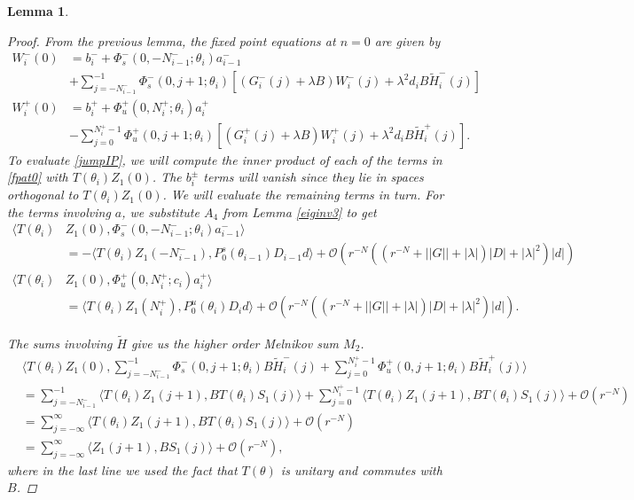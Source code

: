 \documentclass[12pt]{article}
\newtheorem{lemma}{Lemma}
\begin{document}
\begin{lemma}
\begin{proof}
From the previous lemma, the fixed point equations at $n = 0$ are given by 
\begin{equation}\label{fpat0}
\begin{aligned}
W_i^-(0) &= b_i^- +
\Phi_s^-(0, -N_{i-1}^-; \theta_i) a_{i-1}^- \\
&+ \sum_{j = -N_{i-1}^-}^{-1} \Phi_s^-(0, j+1; \theta_i)
[(G_i^-(j) + \lambda B) W_i^-(j) + \lambda^2 d_i B \tilde{H}_i^-(j)] \\
W_i^+(0) &= b_i^+ + \Phi_u^+(0, N_i^+; \theta_i) a_i^+ \\
&- \sum_{j = 0}^{N_i^+-1} \Phi_u^+(0, j+1; \theta_i) 
[(G_i^+(j) + \lambda B) W_i^+(j) + \lambda^2 d_i B \tilde{H}_i^+(j)].
\end{aligned}
\end{equation}
To evaluate \eqref{jumpIP}, we will compute the inner product of each of the terms in \eqref{fpat0} with $T(\theta_i)Z_1(0)$. The $b_i^\pm$ terms will vanish since they lie in spaces orthogonal to $T(\theta_i) Z_1(0)$. We will evaluate the remaining terms in turn. For the terms involving $a$, we substitute $A_4$ from Lemma \ref{eiginv3} to get
\begin{align*}
\langle T(\theta_i) &Z_1(0), \Phi_s^-(0, -N_{i-1}^-; \theta_i) a_{i-1}^- \rangle \\
&= -\langle T(\theta_i) Z_1(-N_{i-1}^-), P_0^s(\theta_{i-1}) D_{i-1} d \rangle + \mathcal{O}\left(r^{-N}( (r^{-N} + ||G|| + |\lambda|)|D| + |\lambda|^2 )|d| \right) \\
\langle T(\theta_i) &Z_1(0), \Phi_u^+(0, N_i^+; c_i) a_i^+ \rangle \\
&= \langle T(\theta_i) Z_1(N_i^+), P_0^u(\theta_i) D_i d \rangle + \mathcal{O}\left(r^{-N}( (r^{-N} + ||G|| + |\lambda|)|D| + |\lambda|^2 )|d| \right).
\end{align*}

The sums involving $\tilde{H}$ give us the higher order Melnikov sum $M_2$.
\begin{align*}
&\langle T(\theta_i) Z_1(0), \sum_{j = -N_{i-1}^-}^{-1} \Phi_s^-(0, j+1; \theta_i) B \tilde{H}_i^-(j) + \sum_{j = 0}^{N_i^+-1} \Phi_u^+(0, j+1; \theta_i) B \tilde{H}_i^+(j) \rangle \\
&= \sum_{j = -N_{i-1}^-}^{-1} \langle T(\theta_i) Z_1(j+1), B T(\theta_i) S_1(j) \rangle + \sum_{j = 0}^{N_i^+-1} \langle T(\theta_i) Z_1(j+1), B T(\theta_i) S_1(j) \rangle + \mathcal{O}(r^{-N})\\
&= \sum_{j = -\infty}^{\infty} \langle T(\theta_i) Z_1(j+1), B T(\theta_i) S_1(j)\rangle + \mathcal{O}(r^{-N}) \\
&= \sum_{j = -\infty}^{\infty} \langle Z_1(j+1), B S_1(j)\rangle + \mathcal{O}(r^{-N}),
\end{align*}
where in the last line we used the fact that $T(\theta)$ is unitary and commutes with $B$.


\end{proof}
\end{lemma}
\end{document}
